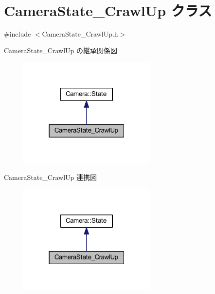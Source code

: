 \hypertarget{class_camera_state___crawl_up}{}\section{Camera\+State\+\_\+\+Crawl\+Up クラス}
\label{class_camera_state___crawl_up}


{\ttfamily \#include $<$Camera\+State\+\_\+\+Crawl\+Up.\+h$>$}



Camera\+State\+\_\+\+Crawl\+Up の継承関係図\nopagebreak
\begin{figure}[H]
\begin{center}
\leavevmode
\includegraphics[width=195pt]{class_camera_state___crawl_up__inherit__graph}
\end{center}
\end{figure}


Camera\+State\+\_\+\+Crawl\+Up 連携図\nopagebreak
\begin{figure}[H]
\begin{center}
\leavevmode
\includegraphics[width=195pt]{class_camera_state___crawl_up__coll__graph}
\end{center}
\end{figure}

